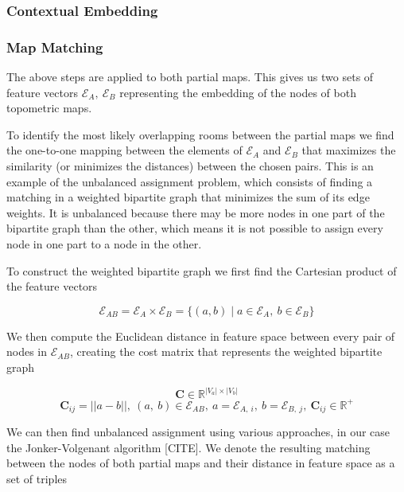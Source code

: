 \subsubsection{Contextual Embedding}


\subsubsection{Map Matching}
The above steps are applied to both partial maps. This gives us two sets of feature vectors \(\mathcal{E}_A,\ \mathcal{E}_B\) representing the embedding of the nodes of both topometric maps.

To identify the most likely overlapping rooms between the partial maps we find the one-to-one mapping between the elements of \(\mathcal{E}_A\) and \(\mathcal{E}_B\) that maximizes the similarity (or minimizes the distances) between the chosen pairs. This is an example of the unbalanced assignment problem, which consists of finding a matching in a weighted bipartite graph that minimizes the sum of its edge weights. It is unbalanced because there may be more nodes in one part of the bipartite graph than the other, which means it is not possible to assign every node in one part to a node in the other. 

To construct the weighted bipartite graph we first find the Cartesian product of the feature vectors 

\begin{equation}
    \label{eq:E_ab}
    \mathcal{E}_{AB} = \mathcal{E}_A \times \mathcal{E}_B = \{(a,b) \mid a \in \mathcal{E}_A,\ b \in \mathcal{E}_B\}
\end{equation}

We then compute the Euclidean distance in feature space between every pair of nodes in \(\mathcal{E}_{AB}\), creating the cost matrix that represents the weighted bipartite graph 

\begin{equation}
    \label{eq:C}
    \mathbf{C} \in \mathbb{R}^{|V_a| \times |V_b|}
\end{equation}
\begin{equation}
    \label{eq:C}
    \mathbf{C}_{ij} = ||a - b||,\ (a,\ b) \in \mathcal{E}_{AB},\ a = \mathcal{E}_{A,\ i},\ b = \mathcal{E}_{B,\ j},\ \mathbf{C}_{ij} \in \mathbb{R}^+
\end{equation}

We can then find unbalanced assignment using various approaches, in our case the Jonker-Volgenant algorithm [CITE]. We denote the resulting matching between the nodes of both partial maps and their distance in feature space as a set of triples 

